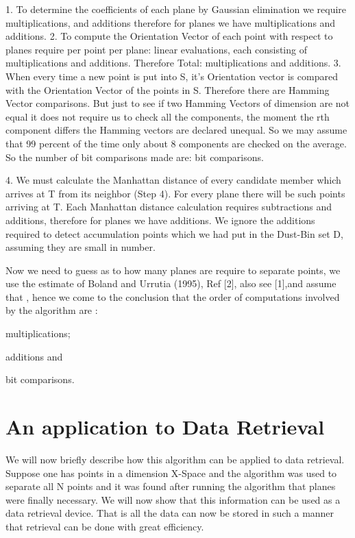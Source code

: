 \documentclass[english]{article}
\begin{document}
1. To determine the coefficients of each plane by Gaussian elimination
we require  multiplications, and 
additions therefore for  planes we have 
multiplications and  additions. 2. To
compute the Orientation Vector of each point with respect to 
planes require per point per plane:  linear evaluations, each
consisting of  multiplications and  additions. Therefore Total:
 multiplications and  additions. 3.
When every time a new point is put into S, it's Orientation vector
is compared with the Orientation Vector of the points in S. Therefore
there are  Hamming Vector comparisons. But just to see
if two Hamming Vectors of dimension  are not equal it does
not require us to check all the  components, the moment the
rth component differs the Hamming vectors are declared unequal. So
we may assume that 99 percent of the time only about 8 components
are checked on the average. So the number of bit comparisons made
are:  bit comparisons.

4. We must calculate the Manhattan distance of every candidate member
which arrives at T from its neighbor (Step 4). For every plane there
will be  such points arriving at T. Each Manhattan distance calculation
requires  subtractions and  additions, therefore for 
planes we have  additions. We ignore the additions required
to detect accumulation points which we had put in the Dust-Bin set
D, assuming they are small in number.

Now we need to guess as to how many planes are require to separate
 points, we use the estimate of Boland and Urrutia (1995),
Ref {[}2{]}, also see {[}1{]},and assume that ,
hence we come to the conclusion that the order of computations involved
by the algorithm are :

 multiplications;


additions and

 bit comparisons.


\section{An application to Data Retrieval}

We will now briefly describe how this algorithm can be applied to
data retrieval. Suppose one has  points in a  dimension X-Space
and the algorithm was used to separate all N points and it was found
after running the algorithm that  planes were finally necessary.
We will now show that this information can be used as a data retrieval
device. That is all the data can now be stored in such a manner that
retrieval can be done with great efficiency. 
\end{document}
